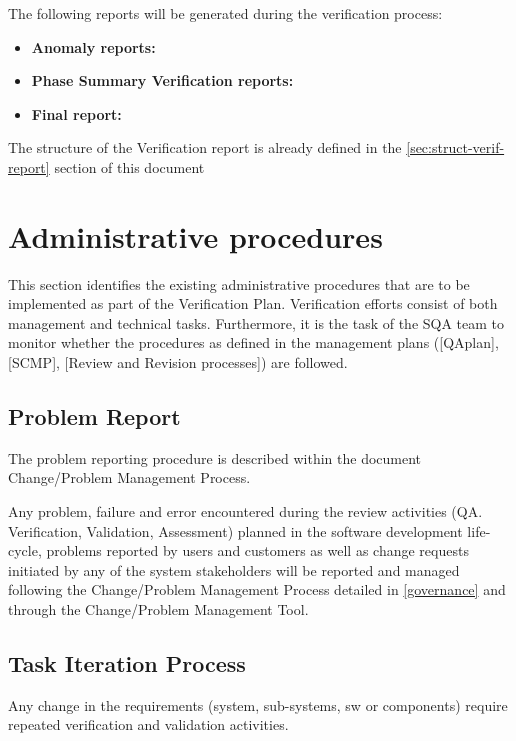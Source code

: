 

The following reports will be generated during the verification process:
\begin{itemize}
\item \textbf{Anomaly reports:} 
\item \textbf{Phase Summary Verification reports:} 
\item \textbf{Final report:}
\end{itemize}

The structure of the Verification report is already defined in the
\ref{sec:struct-verif-report} section of this document 

\section{Administrative procedures}
This section identifies the existing administrative procedures that
are to be implemented as part of the Verification Plan. 
Verification efforts consist of both management and technical tasks.
Furthermore, it is the task of the SQA team to monitor whether the
procedures as defined in the management plans ([QAplan], [SCMP],
[Review and Revision processes]) are followed. 

\subsection{Problem Report}
The problem reporting procedure is described within the document
Change/Problem Management Process.

Any problem, failure and error encountered during the review
activities (QA. Verification, Validation, Assessment) planned in the
software development life-cycle, problems reported by users and
customers as well as change requests initiated by any of the system
stakeholders will be reported and managed following the Change/Problem
Management Process detailed in
\href{https://github.com/openETCS/governance/tree/master/Change-Problem%20Process}{[governance]} and through the Change/Problem Management Tool.

\subsection{Task Iteration Process}
Any change in the requirements (system, sub-systems, sw or components)
require repeated verification and validation activities. 

